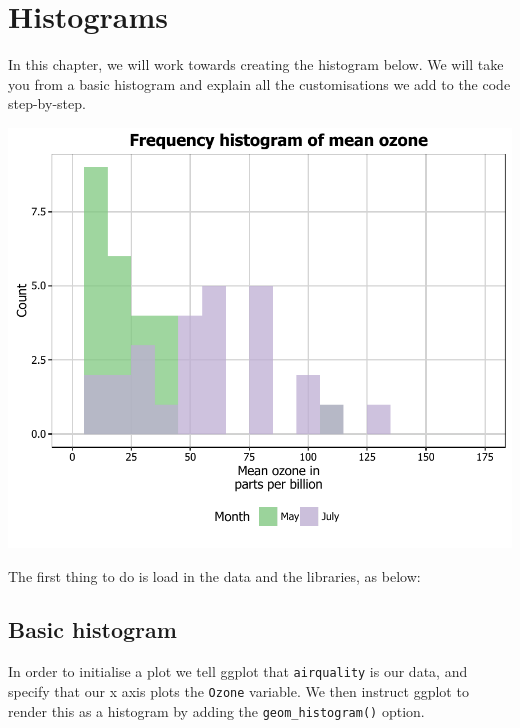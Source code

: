 \chapter{Histograms}

In this chapter, we will work towards creating the histogram below. We
will take you from a basic histogram and explain all the customisations
we add to the code step-by-step.

\begin{center}\includegraphics[width=0.6\linewidth]{7_Histograms_pdf/histogram_final-1} \end{center}

The first thing to do is load in the data and the libraries, as below:

\begin{Shaded}
\begin{Highlighting}[]

\end{Highlighting}
\end{Shaded}

\section{Basic histogram}\label{basic-histogram}

In order to initialise a plot we tell ggplot that \texttt{airquality} is
our data, and specify that our x axis plots the \texttt{Ozone} variable.
We then instruct ggplot to render this as a histogram by adding the
\texttt{geom\_histogram()} option.

\begin{Shaded}
\begin{Highlighting}[]
\StringTok{ }\NormalTok{(} \StringTok{ }\NormalTok{()}
\end{Highlighting}
\end{Shaded}

